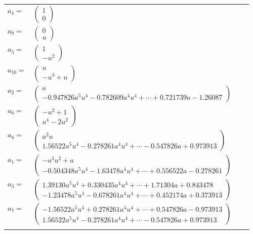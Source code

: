 \documentclass[1p]{elsarticle_modified}
\theoremstyle{definition}
\begin{document}
\begin{tabular}{m{7pt} m{180pt} m{7pt} m{180pt} }
\flushright $a_{4}=$&$\begin{pmatrix}1\\0\end{pmatrix}$ \\
\flushright $a_{9}=$&$\begin{pmatrix}0\\u\end{pmatrix}$ \\
\flushright $a_{5}=$&$\begin{pmatrix}1\\- u^2\end{pmatrix}$ \\
\flushright $a_{10}=$&$\begin{pmatrix}u\\- u^3+u\end{pmatrix}$ \\
\flushright $a_{2}=$&$\begin{pmatrix}a\\-0.947826 a^{5} u^{4}-0.782609 a^{4} u^{4}+\cdots+0.721739 a-1.26087\end{pmatrix}$ \\
\flushright $a_{6}=$&$\begin{pmatrix}- u^2+1\\u^4-2 u^2\end{pmatrix}$ \\
\flushright $a_{8}=$&$\begin{pmatrix}a^2 u\\1.56522 a^{5} u^{4}-0.278261 a^{4} u^{4}+\cdots-0.547826 a+0.973913\end{pmatrix}$ \\
\flushright $a_{1}=$&$\begin{pmatrix}- a^3 u^2+a\\-0.504348 a^{5} u^{4}-1.63478 a^{4} u^{4}+\cdots+0.556522 a-0.278261\end{pmatrix}$ \\
\flushright $a_{3}=$&$\begin{pmatrix}1.39130 a^{5} u^{4}+0.330435 a^{4} u^{4}+\cdots+1.71304 a+0.843478\\-1.23478 a^{5} u^{4}-0.678261 a^{4} u^{4}+\cdots+0.452174 a+0.373913\end{pmatrix}$ \\
\flushright $a_{7}=$&$\begin{pmatrix}-1.56522 a^{5} u^{4}+0.278261 a^{4} u^{4}+\cdots+0.547826 a-0.973913\\1.56522 a^{5} u^{4}-0.278261 a^{4} u^{4}+\cdots-0.547826 a+0.973913\end{pmatrix}$\\&\end{tabular}
\end{document}
